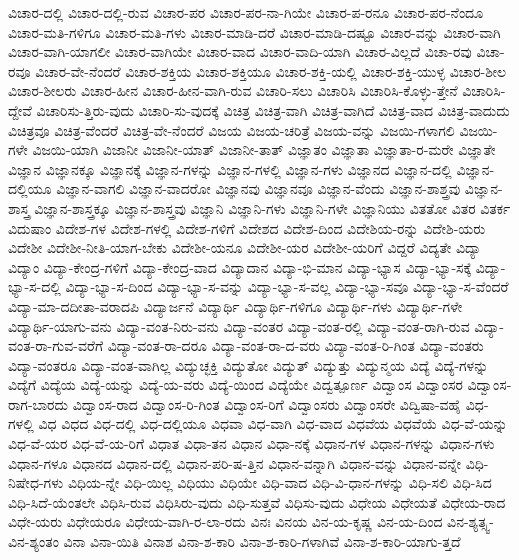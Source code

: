 {ವಿಚಾರ-ದಲ್ಲಿ
ವಿಚಾರ-ದಲ್ಲಿ-ರುವ
ವಿಚಾರ-ಪರ
ವಿಚಾರ-ಪರ-ನಾ-ಗಿಯೇ
ವಿಚಾರ-ಪ-ರನೂ
ವಿಚಾರ-ಪರ-ನೆಂದೂ
ವಿಚಾರ-ಮತಿ-ಗಳಿಗೂ
ವಿಚಾರ-ಮತಿ-ಗಳು
ವಿಚಾರ-ಮಾಡಿ-ದರೆ
ವಿಚಾರ-ಮಾಡಿ-ದಷ್ಟೂ
ವಿಚಾರ-ವನ್ನು
ವಿಚಾರ-ವಾಗಿ
ವಿಚಾರ-ವಾಗಿ-ಯಾಗಲೀ
ವಿಚಾರ-ವಾಗಿಯೇ
ವಿಚಾರ-ವಾದ
ವಿಚಾರ-ವಾದಿ-ಯಾಗಿ
ವಿಚಾರ-ವಿಲ್ಲದೆ
ವಿಚಾ-ರವು
ವಿಚಾ-ರವೂ
ವಿಚಾರ-ವೇ-ನೆಂದರೆ
ವಿಚಾರ-ಶಕ್ತಿಯ
ವಿಚಾರ-ಶಕ್ತಿಯೂ
ವಿಚಾರ-ಶಕ್ತಿ-ಯಲ್ಲಿ
ವಿಚಾರ-ಶಕ್ತಿ-ಯುಳ್ಳ
ವಿಚಾರ-ಶೀಲ
ವಿಚಾರ-ಶೀಲರು
ವಿಚಾರ-ಹೀನ
ವಿಚಾರ-ಹೀನ-ವಾಗಿ-ರುವ
ವಿಚಾರಿ-ಸಲು
ವಿಚಾರಿಸಿ
ವಿಚಾರಿಸಿ-ಕೊಳ್ಳು-ತ್ತೇನೆ
ವಿಚಾರಿಸಿ-ದ್ದೇವೆ
ವಿಚಾರಿಸು-ತ್ತಿರು-ವುದು
ವಿಚಾರಿ-ಸು-ವುದಕ್ಕೆ
ವಿಚಿತ್ರ
ವಿಚಿತ್ರ-ವಾಗಿ
ವಿಚಿತ್ರ-ವಾಗಿದೆ
ವಿಚಿತ್ರ-ವಾದ
ವಿಚಿತ್ರ-ವಾದುದು
ವಿಚಿತ್ರವೂ
ವಿಚಿತ್ರ-ವೆಂದರೆ
ವಿಚಿತ್ರ-ವೇ-ನೆಂದರೆ
ವಿಜಯ
ವಿಜಯ-ಚರಿತ್ರೆ
ವಿಜಯ-ವನ್ನು
ವಿಜಯಿ-ಗಳಾಗಲಿ
ವಿಜಯಿ-ಗಳೇ
ವಿಜಯಿ-ಯಾಗಿ
ವಿಜಾನೀ
ವಿಜಾನೀ-ಯಾತ್
ವಿಜಾನೀ-ತಾತ್
ವಿಜ್ಞಾತಂ
ವಿಜ್ಞಾತಾ
ವಿಜ್ಞಾತಾ-ರ-ಮರೇ
ವಿಜ್ಞಾತೇ
ವಿಜ್ಞಾನ
ವಿಜ್ಞಾನಕ್ಕೂ
ವಿಜ್ಞಾನಕ್ಕೆ
ವಿಜ್ಞಾನ-ಗಳನ್ನು
ವಿಜ್ಞಾನ-ಗಳಲ್ಲಿ
ವಿಜ್ಞಾನ-ಗಳು
ವಿಜ್ಞಾನದ
ವಿಜ್ಞಾನ-ದಲ್ಲಿ
ವಿಜ್ಞಾನ-ದಲ್ಲಿಯೂ
ವಿಜ್ಞಾನ-ವಾಗಲಿ
ವಿಜ್ಞಾನ-ವಾದರೋ
ವಿಜ್ಞಾನವು
ವಿಜ್ಞಾನವೂ
ವಿಜ್ಞಾನ-ವೆಂದು
ವಿಜ್ಞಾನ-ಶಾಶ್ತ್ರವು
ವಿಜ್ಞಾನ-ಶಾಸ್ತ್ರ
ವಿಜ್ಞಾನ-ಶಾಸ್ತ್ರಕ್ಕೂ
ವಿಜ್ಞಾನ-ಶಾಸ್ತ್ರವು
ವಿಜ್ಞಾನಿ
ವಿಜ್ಞಾನಿ-ಗಳು
ವಿಜ್ಞಾನಿ-ಗಳೇ
ವಿಜ್ಞಾನಿಯು
ವಿತತೋ
ವಿತರ
ವಿತರ್ಕ
ವಿದುಷಾಂ
ವಿದೇಶ-ಗಳ
ವಿದೇಶ-ಗಳಲ್ಲಿ
ವಿದೇಶ-ಗಳಿಗೆ
ವಿದೇಶದ
ವಿದೇಶ-ದಿಂದ
ವಿದೇಶಿಯ-ರನ್ನು
ವಿದೇಶಿ-ಯರು
ವಿದೇಶೀ
ವಿದೇಶೀ-ನೀತಿ-ಯಾಗ-ಬೇಕು
ವಿದೇಶೀ-ಯನೂ
ವಿದೇಶೀ-ಯರ
ವಿದೇಶೀ-ಯರಿಗೆ
ವಿದ್ದರೆ
ವಿದ್ಯತೇ
ವಿದ್ಯಾ
ವಿದ್ಯಾಂ
ವಿದ್ಯಾ-ಕೇಂದ್ರ-ಗಳಿಗೆ
ವಿದ್ಯಾ-ಕೇಂದ್ರ-ವಾದ
ವಿದ್ಯಾದಾನ
ವಿದ್ಯಾ-ಭಿ-ಮಾನ
ವಿದ್ಯಾ-ಭ್ಯಾಸ
ವಿದ್ಯಾ-ಭ್ಯಾ-ಸಕ್ಕೆ
ವಿದ್ಯಾ-ಭ್ಯಾ-ಸ-ದಲ್ಲಿ
ವಿದ್ಯಾ-ಭ್ಯಾ-ಸ-ದಿಂದ
ವಿದ್ಯಾ-ಭ್ಯಾ-ಸ-ವನ್ನು
ವಿದ್ಯಾ-ಭ್ಯಾ-ಸ-ವಲ್ಲ
ವಿದ್ಯಾ-ಭ್ಯಾ-ಸವೂ
ವಿದ್ಯಾ-ಭ್ಯಾ-ಸ-ವೆಂದರೆ
ವಿದ್ಯಾ-ಮಾ-ದದೀತಾ-ವರಾದಪಿ
ವಿದ್ಯಾರ್ಜನೆ
ವಿದ್ಯಾರ್ಥಿ
ವಿದ್ಯಾರ್ಥಿ-ಗಳಿಗೂ
ವಿದ್ಯಾರ್ಥಿ-ಗಳು
ವಿದ್ಯಾರ್ಥಿ-ಗಳೇ
ವಿದ್ಯಾರ್ಥಿ-ಯಾಗು-ವನು
ವಿದ್ಯಾ-ವಂತ-ನಿರು-ವನು
ವಿದ್ಯಾ-ವಂತರ
ವಿದ್ಯಾ-ವಂತ-ರಲ್ಲಿ
ವಿದ್ಯಾ-ವಂತ-ರಾಗಿ-ರುವ
ವಿದ್ಯಾ-ವಂತ-ರಾ-ಗುವ-ವರೆಗೆ
ವಿದ್ಯಾ-ವಂತ-ರಾ-ದರೂ
ವಿದ್ಯಾ-ವಂತ-ರಾ-ದ-ವರು
ವಿದ್ಯಾ-ವಂತ-ರಿ-ಗಿಂತ
ವಿದ್ಯಾ-ವಂತರು
ವಿದ್ಯಾ-ವಂತರೂ
ವಿದ್ಯಾ-ವಂತ-ವಾಗಿಲ್ಲ
ವಿದ್ಯುಚ್ಛಕ್ತಿ
ವಿದ್ಯುತೋ
ವಿದ್ಯುತ್
ವಿದ್ಯುತ್ತು
ವಿದ್ಯುನ್ಮಯ
ವಿದ್ಯೆ
ವಿದ್ಯೆ-ಗಳನ್ನು
ವಿದ್ಯೆಗೆ
ವಿದ್ಯೆಯ
ವಿದ್ಯೆ-ಯನ್ನು
ವಿದ್ಯೆ-ಯ-ವರು
ವಿದ್ಯೆ-ಯಿಂದ
ವಿದ್ಯೆಯೇ
ವಿದ್ವತ್ಪೂರ್ಣ
ವಿದ್ವಾಂಸ
ವಿದ್ವಾಂಸರ
ವಿದ್ವಾಂಸ-ರಾಗ-ಬಾರದು
ವಿದ್ವಾಂಸ-ರಾದ
ವಿದ್ವಾಂಸ-ರಿ-ಗಿಂತ
ವಿದ್ವಾಂಸ-ರಿಗೆ
ವಿದ್ವಾಂಸರು
ವಿದ್ವಾಂಸರೇ
ವಿದ್ವಿಷಾ-ವಹೈ
ವಿಧ-ಗಳಲ್ಲಿ
ವಿಧ
ವಿಧದ
ವಿಧ-ದಲ್ಲಿ
ವಿಧ-ದಲ್ಲಿಯೂ
ವಿಧವಾ
ವಿಧ-ವಾಗಿ
ವಿಧ-ವಾದ
ವಿಧವೆಯ
ವಿಧವೆಯೆ
ವಿಧ-ವೆ-ಯನ್ನು
ವಿಧ-ವೆ-ಯರ
ವಿಧ-ವೆ-ಯ-ರಿಗೆ
ವಿಧಾತ
ವಿಧಾ-ತನ
ವಿಧಾನ
ವಿಧಾ-ನಕ್ಕೆ
ವಿಧಾನ-ಗಳ
ವಿಧಾನ-ಗಳನ್ನು
ವಿಧಾನ-ಗಳು
ವಿಧಾನ-ಗಳೂ
ವಿಧಾನದ
ವಿಧಾನ-ದಲ್ಲಿ
ವಿಧಾನ-ಪರಿ-ಷ-ತ್ತಿನ
ವಿಧಾನ-ವನ್ನಾಗಿ
ವಿಧಾನ-ವನ್ನು
ವಿಧಾನ-ವನ್ನೇ
ವಿಧಿ-ನಿಷೇಧ-ಗಳು
ವಿಧಿಯ-ನ್ನೇ
ವಿಧಿ-ಯಿಲ್ಲ
ವಿಧಿಯು
ವಿಧಿಯೇ
ವಿಧಿ-ವಾದ
ವಿಧಿ-ವಿ-ಧಾನ-ಗಳನ್ನು
ವಿಧಿ-ಸಲಿ
ವಿಧಿ-ಸಿದ
ವಿಧಿ-ಸಿದೆ-ಯೆಂತಲೇ
ವಿಧಿಸಿ-ರುವ
ವಿಧಿಸಿರು-ವುದು
ವಿಧಿ-ಸುತ್ತವೆ
ವಿಧಿಸು-ವುದು
ವಿಧೇಯ
ವಿಧೇಯತೆ
ವಿಧೇಯ-ರಾದ
ವಿಧೇ-ಯರು
ವಿಧೇಯರೂ
ವಿಧೇಯ-ವಾಗಿ-ರ-ಲಾ-ರದು
ವಿನಃ
ವಿನಯ
ವಿನ-ಯ-ಕೃಷ್ಣ
ವಿನ-ಯ-ದಿಂದ
ವಿನ-ಶ್ಯತ್ಸ್ವ-ವಿನ-ಶ್ಯಂತಂ
ವಿನಾ
ವಿನಾ-ಯಿತಿ
ವಿನಾಶ
ವಿನಾ-ಶ-ಕಾರಿ
ವಿನಾ-ಶ-ಕಾರಿ-ಗಳಾಗಿವೆ
ವಿನಾ-ಶ-ಕಾರಿ-ಯಾಗು-ತ್ತದೆ
}
